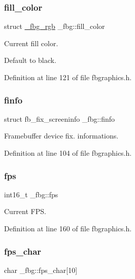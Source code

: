 \subsubsection{\texorpdfstring{fill\+\_\+color}{fill\_color}}
{\footnotesize\ttfamily struct \mbox{\hyperlink{fbgraphics_8h_struct__fbg__rgb}{\+\_\+fbg\+\_\+rgb}} \+\_\+fbg\+::fill\+\_\+color}



Current fill color. 

Default to black. 

Definition at line 121 of file fbgraphics.\+h.

\mbox{\label{struct__fbg_a954dd14a4129eed7ebe09f31bd025861}} 
\subsubsection{\texorpdfstring{finfo}{finfo}}
{\footnotesize\ttfamily struct fb\+\_\+fix\+\_\+screeninfo \+\_\+fbg\+::finfo}



Framebuffer device fix. informations. 



Definition at line 104 of file fbgraphics.\+h.

\mbox{\label{struct__fbg_a64b16363bc48d1e19141df2e242930a9}} 
\subsubsection{\texorpdfstring{fps}{fps}}
{\footnotesize\ttfamily int16\+\_\+t \+\_\+fbg\+::fps}



Current F\+PS. 



Definition at line 160 of file fbgraphics.\+h.

\mbox{\label{struct__fbg_af447e6ed58d893989c8dad075807a79b}} 
\subsubsection{\texorpdfstring{fps\+\_\+char}{fps\_char}}
{\footnotesize\ttfamily char \+\_\+fbg\+::fps\+\_\+char\mbox{[}10\mbox{]}}



